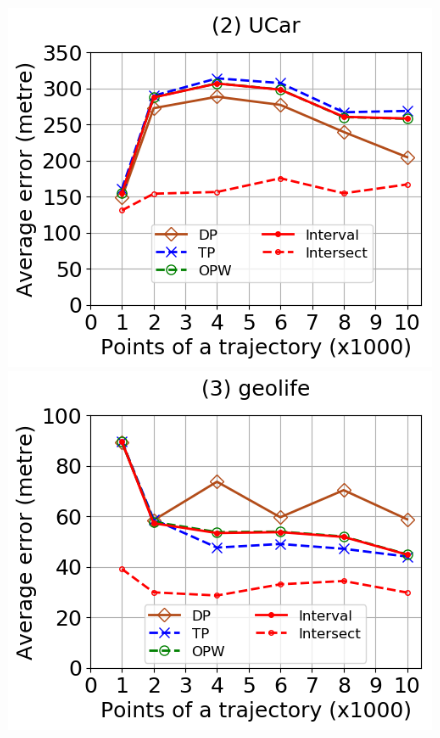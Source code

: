 \begin{figure}[tb!]
	\centering
	\includegraphics[scale=0.320]{Figures/Exp-query-DAD-error-size-service.png}	\hspace{3ex}
	\includegraphics[scale=0.320]{Figures/Exp-query-DAD-error-size-geolife.png}	\hspace{3ex}

\end{figure}
